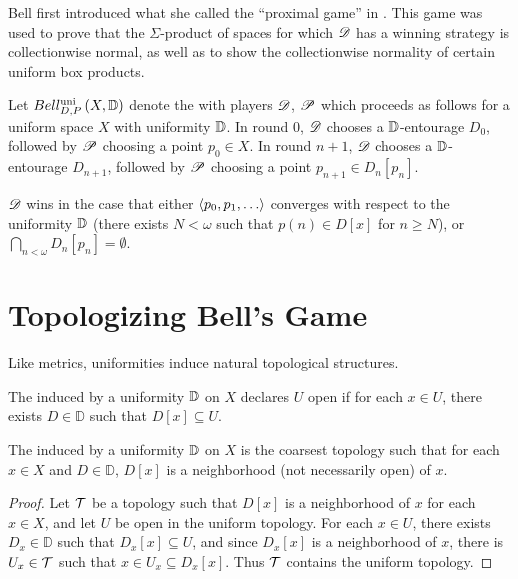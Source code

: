 Bell first introduced what she called the ``proximal game'' in \cite{MR3239205}.
This game was used to prove that the
$\Sigma$-product of spaces for which $\mathscr{D}$ has a winning strategy is
collectionwise normal, as well as to show the collectionwise normality
of certain uniform box products.

\begin{game}
  Let $Bell_{D,P}^{\textrm{uni}}\left({X, \mathbb{D}}\right)$ denote the 
  with players $\mathscr{D}$, $\mathscr{P}$ which
  proceeds as follows for a uniform space $X$ with uniformity $\mathbb{D}$. In round
  $0$, $\mathscr{D}$ chooses a $\mathbb{D}$-entourage $D_0$, followed by $\mathscr{P}$ choosing a
  point $p_0\in X$. In round $n+1$, $\mathscr{D}$ chooses a $\mathbb{D}$-entourage
  $D_{n+1}$, followed by $\mathscr{P}$ choosing a point $p_{n+1}\in D_n[p_n]$.

  $\mathscr{D}$ wins in the case that either $\<p_0,p_1,\dots\>$ converges
  with respect to the uniformity $\mathbb{D}$ (there exists $N<\omega$ such that
  $p(n)\in D[x]$ for $n\geq N$), or $\bigcap_{n<\omega}D_n[p_n] = \emptyset$.
\end{game}

\section{Topologizing Bell's Game}

Like metrics, uniformities induce natural topological structures.

\begin{defn}
  The  induced by a uniformity $\mathbb{D}$ on $X$
  declares $U$ open if for each $x\in U$, there exists $D\in\mathbb{D}$
  such that $D[x]\subseteq U$.
\end{defn}

\begin{thm}
  The  induced by a uniformity $\mathbb{D}$ on $X$ is the
  coarsest topology such that for each $x\in X$ and $D\in\mathbb{D}$,
  $D[x]$ is a neighborhood (not necessarily open) of $x$.
\end{thm}

\begin{proof}
  Let $\mathcal{T}$ be a topology such that $D[x]$ is a neighborhood
  of $x$ for each $x\in X$, and let $U$ be open in the uniform topology.
  For each $x\in U$, there exists $D_x\in\mathbb{D}$ such that
  $D_x[x]\subseteq U$, and since $D_x[x]$ is a neighborhood of $x$, there
  is $U_x\in \mathcal{T}$ such that $x\in U_x\subseteq D_x[x]$. Thus
  $\mathcal{T}$ contains the uniform topology.
\end{proof}

